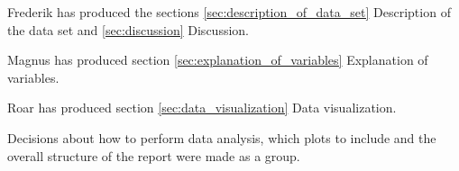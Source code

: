Frederik has produced the sections \ref{sec:description_of_data_set} Description of the data set and \ref{sec:discussion} Discussion.

Magnus has produced section \ref{sec:explanation_of_variables} Explanation of variables.

Roar has produced section \ref{sec:data_visualization} Data visualization.

Decisions about how to perform data analysis, which plots to include and the overall structure of the report were made as a group.